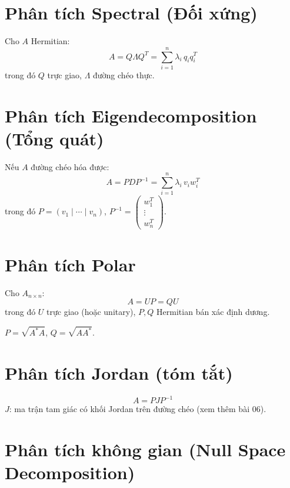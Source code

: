 \section{Phân tích Spectral (Đối xứng)}

Cho $A$ Hermitian:
\[
A = Q\Lambda Q^T = \sum_{i=1}^n \lambda_i \, q_i q_i^T
\]
trong đó $Q$ trực giao, $\Lambda$ đường chéo thực.

\section{Phân tích Eigendecomposition (Tổng quát)}

Nếu $A$ đường chéo hóa được:
\[
A = PDP^{-1} = \sum_{i=1}^n \lambda_i \, v_i w_i^T
\]
trong đó $P = (v_1 \mid \cdots \mid v_n)$, $P^{-1} = \begin{pmatrix} w_1^T \\ \vdots \\ w_n^T \end{pmatrix}$.

\section{Phân tích Polar}

Cho $A_{n \times n}$:
\[
A = UP = QU
\]
trong đó $U$ trực giao (hoặc unitary), $P, Q$ Hermitian bán xác định dương.

$P = \sqrt{A^*A}$, \quad $Q = \sqrt{AA^*}$.

\section{Phân tích Jordan (tóm tắt)}

\[
A = PJP^{-1}
\]
$J$: ma trận tam giác có khối Jordan trên đường chéo (xem thêm bài 06).

\section{Phân tích không gian (Null Space Decomposition)}

